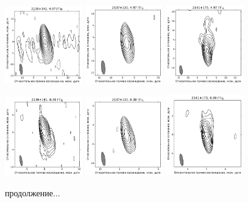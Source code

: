 \begin{figure}
  \includegraphics[width=0.3\textwidth]{2136+141_C.pdf}
  \includegraphics[width=0.3\textwidth]{2137+130_C.pdf}
  \includegraphics[width=0.3\textwidth]{2141+175_C.pdf}


  \includegraphics[width=0.3\textwidth]{2136+141_X.pdf}
  \includegraphics[width=0.3\textwidth]{2137+130_X.pdf}
  \includegraphics[width=0.3\textwidth]{2141+175_X.pdf}

  \caption{продолжение...}
\end{figure}

